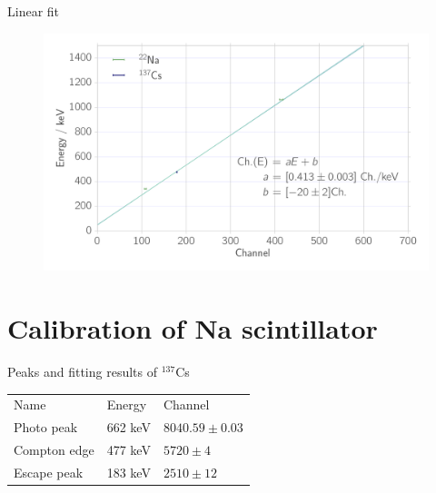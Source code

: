 \documentclass[xcolor=x11names,compress]{beamer}
\renewcommand{\(}{\begin{columns}}
\renewcommand{\)}{\end{columns}}
\newcommand{\<}[1]{\begin{column}{#1}}
\renewcommand{\>}{\end{column}}
\begin{document}
\begin{frame}[t]{Linear fit}
\begin{figure}[htpb]
    \centering
    \includegraphics[width=1.0\linewidth]{../analysis/figures/calibration_ps_linear_fit}
\label{fig:calibration_ps_linear_fit}
\end{figure}
\end{frame}

\section{Calibration of Na scintillator}

\begin{frame}[t]{Peaks and fitting results of $^{137}$Cs}

    \begin{table}[htpb]
    \centering
\label{tab:peaks_cs_ps}
    \begin{tabular}{lll}
        \rowcolor{LightCyan} Name &Energy & Channel \\ 
        Photo peak & 662 keV & $8040.59 \pm 0.03$\\ 
        Compton edge & 477 keV & $5720 \pm 4$\\  
        Escape peak & 183 keV & $2510 \pm 12$
    \end{tabular}
\end{table}

\end{frame}
\end{document}

